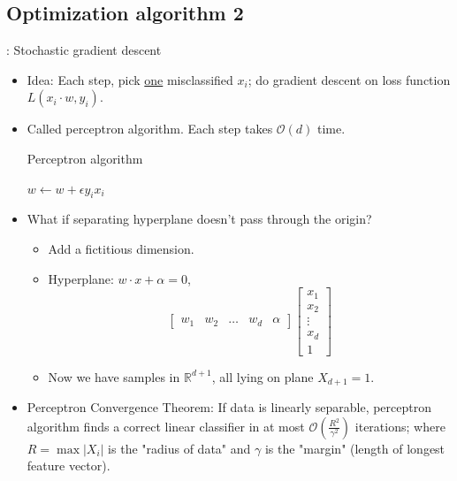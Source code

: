 \documentclass[10pt]{article}
\begin{document}
	\subsection*{Optimization algorithm 2}: Stochastic gradient descent
		\
		\begin{itemize}
			\item Idea: Each step, pick \underline{one} misclassified $x_{i}$; do gradient descent on loss function $L(x_{i} \cdot w, y_{i})$.
			\item Called perceptron algorithm. Each step takes $\mathcal{O}(d)$ time.

			\begin{algorithm*}
			\caption{Perceptron algorithm}
			\begin{algorithmic}
			\State $w \leftarrow w + \epsilon y_{i}x_{i}$
			\EndWhile
			\end{algorithmic}
			\end{algorithm*}
		
		\item What if separating hyperplane doesn't pass through the origin?
			\begin{itemize}
				\item Add a fictitious dimension.
				\item Hyperplane: $w \cdot x + \alpha = 0$,
					$$
						\begin{bmatrix} w_{1} & w_{2} & \dots & w_{d} & \alpha \end{bmatrix}
						\begin{bmatrix}
 							x_{1} \\
 							x_{2} \\
 							\vdots \\
 							x_{d}	\\
 							1
 						\end{bmatrix}
					$$
				\item Now we have samples in $\mathbb{R}^{d+1}$, all lying on plane $X_{d+1} = 1$.
			\end{itemize}
		
		\item Perceptron Convergence Theorem: If data is linearly separable, perceptron algorithm finds a correct linear classifier in at most $\mathcal{O}(\frac{R^{2}}{\gamma^{2}})$ iterations; where $R = \max |X_{i}|$ is the "radius of data" and $\gamma$ is the "margin"  (length of longest feature vector).
		\end{itemize}
		
\end{document}
